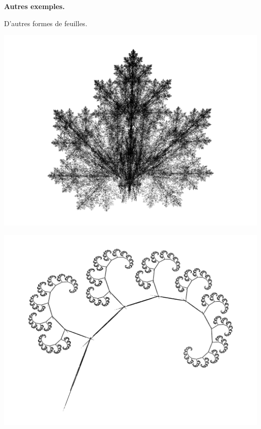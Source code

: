 \documentclass[11pt,class=report,crop=false]{standalone}
\begin{document}
\bigskip

\textbf{Autres exemples.}

D'autres formes de feuilles.
\begin{center}
\includegraphics[scale=\myscale,scale=0.6]{figures/ifs-03}
\end{center}

\begin{center}
\includegraphics[scale=\myscale,scale=0.6]{figures/ifs-04}
\end{center}
\end{document}
